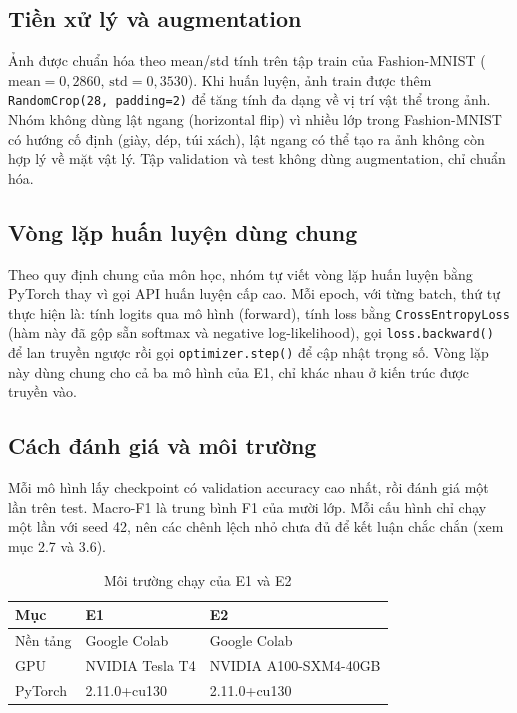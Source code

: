 \documentclass[12pt,a4paper]{article}
\begin{document}
\subsection{Tiền xử lý và augmentation}

Ảnh được chuẩn hóa theo mean/std tính trên tập train của Fashion-MNIST
($\text{mean}=0{,}2860$, $\text{std}=0{,}3530$). Khi huấn luyện, ảnh train được
thêm \texttt{RandomCrop(28, padding=2)} để tăng tính đa dạng về vị trí vật thể
trong ảnh. Nhóm không dùng lật ngang (horizontal flip) vì nhiều lớp trong
Fashion-MNIST có hướng cố định (giày, dép, túi xách), lật ngang có thể tạo ra
ảnh không còn hợp lý về mặt vật lý. Tập validation và test không dùng
augmentation, chỉ chuẩn hóa.

\subsection{Vòng lặp huấn luyện dùng chung}

Theo quy định chung của môn học, nhóm tự viết vòng lặp huấn luyện bằng
PyTorch thay vì gọi API huấn luyện cấp cao. Mỗi epoch, với từng batch, thứ tự
thực hiện là: tính logits qua mô hình (forward), tính loss bằng
\texttt{CrossEntropyLoss} (hàm này đã gộp sẵn softmax và negative
log-likelihood), gọi \texttt{loss.backward()} để lan truyền ngược rồi gọi
\texttt{optimizer.step()} để cập nhật trọng số. Vòng lặp này dùng chung cho cả
ba mô hình của E1, chỉ khác nhau ở kiến trúc được truyền vào.

\subsection{Cách đánh giá và môi trường}

Mỗi mô hình lấy checkpoint có validation accuracy cao nhất, rồi đánh giá một
lần trên test. Macro-F1 là trung bình F1 của mười lớp. Mỗi cấu hình chỉ chạy
một lần với seed 42, nên các chênh lệch nhỏ chưa đủ để kết luận chắc chắn
(xem mục 2.7 và 3.6).

\begin{table}[H]
\centering
\caption{Môi trường chạy của E1 và E2}
\begin{tabular}{lll}
\toprule
Mục & E1 & E2 \\
\midrule
Nền tảng & Google Colab & Google Colab \\
GPU & NVIDIA Tesla T4 & NVIDIA A100-SXM4-40GB \\
PyTorch & 2.11.0+cu130 & 2.11.0+cu130 \\
\bottomrule
\end{tabular}
\end{table}
\end{document}
